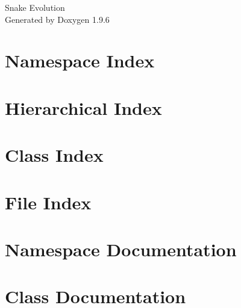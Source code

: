 \documentclass[twoside]{book}
\newcommand{\+}{\discretionary{\mbox{\scriptsize$\hookleftarrow$}}{}{}}
\newcommand{\clearemptydoublepage}{%
    \newpage{\pagestyle{empty}\cleardoublepage}%
  }
\begin{document}
  \raggedbottom
    \hypersetup{pageanchor=false,
                bookmarksnumbered=true,
                pdfencoding=unicode
               }
  \begin{titlepage}
  \vspace*{7cm}
  \begin{center}%
  {\Large Snake Evolution}\\
  \vspace*{1cm}
  {\large Generated by Doxygen 1.9.6}\\
  \end{center}
  \end{titlepage}
  \clearemptydoublepage
  \tableofcontents
  \clearemptydoublepage
  \hypersetup{pageanchor=true}
\chapter{Namespace Index}

\chapter{Hierarchical Index}

\chapter{Class Index}

\chapter{File Index}

\chapter{Namespace Documentation}







\chapter{Class Documentation}





















\end{document}
